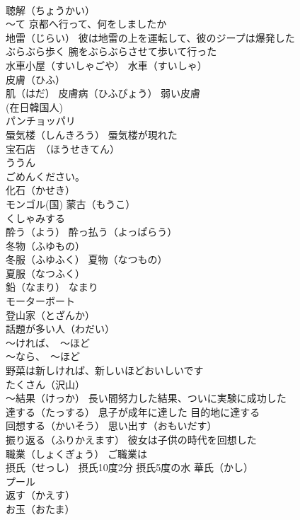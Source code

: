 \documentclass[8pt]{extreport}
\begin{document}
\begin{CJK}{UTF8}{min}
\\	聴解（ちょうかい）
\\	～て 京都へ行って、何をしましたか
\\	地雷（じらい） 彼は地雷の上を運転して、彼のジープは爆発した
\\	ぶらぶら歩く 腕をぶらぶらさせて歩いて行った
\\	水車小屋（すいしゃごや） 水車（すいしゃ）
\\	皮膚（ひふ）
\\	肌（はだ） 皮膚病（ひふびょう） 弱い皮膚
\\	(在日韓国人) 
\\	パンチョッパリ
\\	蜃気楼（しんきろう） 蜃気楼が現れた
\\	宝石店　（ほうせきてん）
\\	ううん
\\	ごめんください。
\\	化石（かせき）
\\	モンゴル(国) 蒙古（もうこ）
\\	くしゃみする
\\	酔う（よう） 酔っ払う（よっぱらう）
\\	冬物（ふゆもの）
\\	冬服（ふゆふく） 夏物（なつもの）
\\	夏服（なつふく）
\\	鉛（なまり） なまり 
\\	モーターボート
\\	登山家（とざんか）
\\	話題が多い人（わだい）
\\	～ければ、　～ほど 
\\	～なら、　～ほど 
\\	野菜は新しければ、新しいほどおいしいです
\\	たくさん（沢山）
\\	～結果（けっか） 長い間努力した結果、ついに実験に成功した
\\	達する（たっする） 息子が成年に達した 目的地に達する
\\	回想する（かいそう） 思い出す（おもいだす） 
\\	振り返る（ふりかえます） 彼女は子供の時代を回想した
\\	職業（しょくぎょう） ご職業は
\\	摂氏（せっし） 摂氏10度2分 摂氏5度の水 華氏（かし）
\\	プール
\\	返す（かえす）
\\	お玉（おたま）

\end{CJK}
\end{document}
